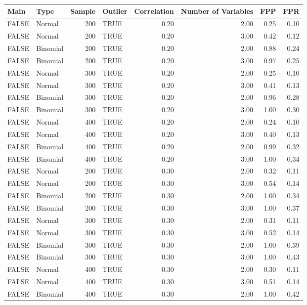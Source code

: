 \begin{longtable}{llrlrrrr}
  \hline
Main & Type & Sample & Outlier & Correlation & Number of Variables & FPP & FPR \\ 
  \hline
FALSE & Normal & 200 & TRUE & 0.20 & 2.00 & 0.25 & 0.10 \\ 
  FALSE & Normal & 200 & TRUE & 0.20 & 3.00 & 0.42 & 0.12 \\ 
  FALSE & Binomial & 200 & TRUE & 0.20 & 2.00 & 0.88 & 0.24 \\ 
  FALSE & Binomial & 200 & TRUE & 0.20 & 3.00 & 0.97 & 0.25 \\ 
  FALSE & Normal & 300 & TRUE & 0.20 & 2.00 & 0.25 & 0.10 \\ 
  FALSE & Normal & 300 & TRUE & 0.20 & 3.00 & 0.41 & 0.13 \\ 
  FALSE & Binomial & 300 & TRUE & 0.20 & 2.00 & 0.96 & 0.28 \\ 
  FALSE & Binomial & 300 & TRUE & 0.20 & 3.00 & 1.00 & 0.30 \\ 
  FALSE & Normal & 400 & TRUE & 0.20 & 2.00 & 0.24 & 0.10 \\ 
  FALSE & Normal & 400 & TRUE & 0.20 & 3.00 & 0.40 & 0.13 \\ 
  FALSE & Binomial & 400 & TRUE & 0.20 & 2.00 & 0.99 & 0.32 \\ 
  FALSE & Binomial & 400 & TRUE & 0.20 & 3.00 & 1.00 & 0.34 \\ 
  FALSE & Normal & 200 & TRUE & 0.30 & 2.00 & 0.32 & 0.11 \\ 
  FALSE & Normal & 200 & TRUE & 0.30 & 3.00 & 0.54 & 0.14 \\ 
  FALSE & Binomial & 200 & TRUE & 0.30 & 2.00 & 1.00 & 0.34 \\ 
  FALSE & Binomial & 200 & TRUE & 0.30 & 3.00 & 1.00 & 0.37 \\ 
  FALSE & Normal & 300 & TRUE & 0.30 & 2.00 & 0.31 & 0.11 \\ 
  FALSE & Normal & 300 & TRUE & 0.30 & 3.00 & 0.52 & 0.14 \\ 
  FALSE & Binomial & 300 & TRUE & 0.30 & 2.00 & 1.00 & 0.39 \\ 
  FALSE & Binomial & 300 & TRUE & 0.30 & 3.00 & 1.00 & 0.43 \\ 
  FALSE & Normal & 400 & TRUE & 0.30 & 2.00 & 0.30 & 0.11 \\ 
  FALSE & Normal & 400 & TRUE & 0.30 & 3.00 & 0.51 & 0.14 \\ 
  FALSE & Binomial & 400 & TRUE & 0.30 & 2.00 & 1.00 & 0.42 \\ 

\end{longtable}
